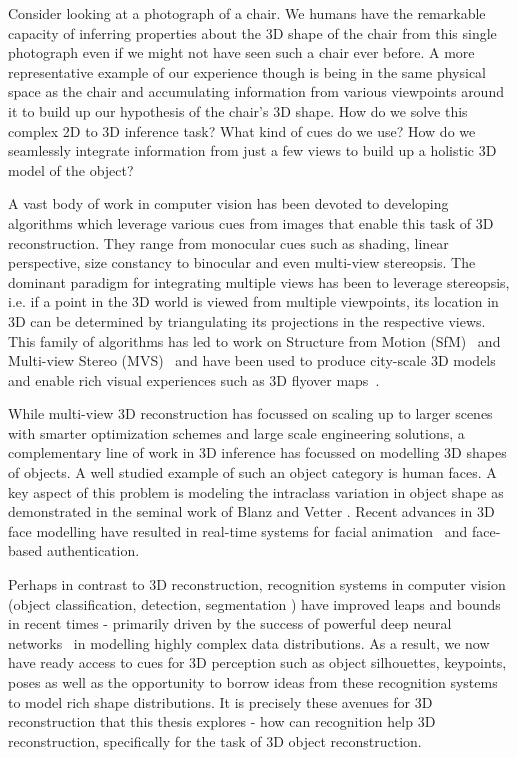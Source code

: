 \documentclass[../thesis.tex]{subfiles}
\begin{document}
Consider looking at a photograph of a chair. We humans have the remarkable capacity of inferring properties about the 3D shape of the chair from this single photograph even if we might not have seen such a chair ever before. A more representative example of our experience though is being in the same physical space as the chair and accumulating information from various viewpoints around it to build up our hypothesis of the chair’s 3D shape. How do we solve this complex 2D to 3D inference task? What kind of cues do we use? How do we seamlessly integrate information from just a few views to build up a holistic 3D model of the object?

A vast body of work in computer vision has been devoted to developing algorithms which leverage various cues from images that enable this task of 3D reconstruction. They range from monocular cues such as shading, linear perspective, size constancy \etc \cite{palmer1999vision} to binocular \cite{louis1960methods} and even multi-view stereopsis. The dominant paradigm for integrating multiple views has been to leverage stereopsis, i.e. if a point in the 3D world is viewed from multiple viewpoints, its location in 3D can be determined by triangulating its projections in the respective views. This family of algorithms has led to work on Structure from Motion (SfM)~\cite{17kruppa1913,longuet1981computer,TomasiKanade92} and Multi-view Stereo (MVS)~\cite{seitz2006comparison,furukawa2015multi} and have been used to produce city-scale 3D models~\cite{agarwal2011building} and enable rich visual experiences such as 3D flyover maps~\cite{kushal2012photo}.

While multi-view 3D reconstruction has focussed on scaling up to larger scenes with smarter optimization schemes and large scale engineering solutions, a complementary line of work in 3D inference has focussed on modelling 3D shapes of objects. A well studied example of such an object category is human faces. A key aspect of this problem is modeling the intraclass variation in object shape as demonstrated in the seminal work of Blanz and Vetter \cite{blanz1999morphable}. Recent advances \cite{kemelmacher2011internet,movingFace:eccv14} in 3D face modelling have resulted in real-time systems for facial animation~\cite{thies2016face} and face-based authentication. 

Perhaps in contrast to 3D reconstruction, recognition systems in computer vision (object classification, detection, segmentation \etc) have improved leaps and bounds in recent times - primarily driven by the success of powerful deep neural networks~\cite{Lecun89} in modelling highly complex data distributions. As a result, we now have ready access to cues for 3D perception such as object silhouettes, keypoints, poses as well as the opportunity to borrow ideas from these recognition systems to model rich shape distributions. It is precisely these avenues for 3D reconstruction that this thesis explores - how can recognition help 3D reconstruction, specifically for the task of 3D object reconstruction. 
\end{document}

